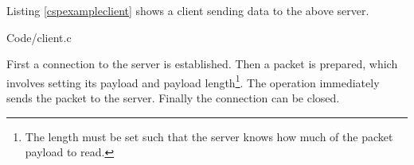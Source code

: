 Listing \ref{cspexampleclient} shows a client sending data to the above server.


{Code/client.c}

First a connection to the server is established. Then a packet is prepared, which involves setting its payload and payload length\footnote{The length must be set such that the server knows how much of the packet payload to read.}. The  operation immediately sends the packet to the server. Finally the connection can be closed.